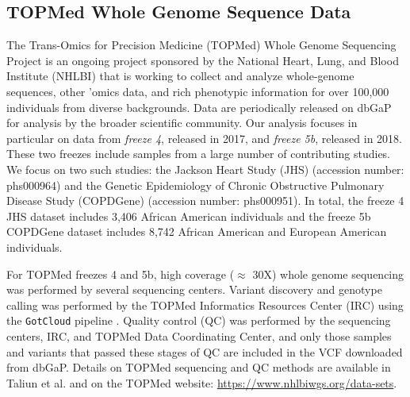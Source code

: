 \documentclass[12pt]{article}
\begin{document}


\subsection{TOPMed Whole Genome Sequence Data}

The Trans-Omics for Precision Medicine (TOPMed) Whole Genome Sequencing Project is an ongoing project sponsored by the National Heart, Lung, and Blood Institute (NHLBI) that is working to collect and analyze whole-genome sequences, other 'omics data, and rich phenotypic information for over 100,000 individuals from diverse backgrounds. 
Data are periodically released on dbGaP for analysis by the broader scientific community. 
Our analysis focuses in particular on data from \textit{freeze 4}, released in 2017, and \textit{freeze 5b}, released in 2018.
These two freezes include samples from a large number of contributing studies.
We focus on two such studies: the Jackson Heart Study (JHS) (accession number: phs000964) and the Genetic Epidemiology of Chronic Obstructive Pulmonary Disease Study (COPDGene) (accession number: phs000951).
In total, the freeze 4 JHS dataset includes 3,406 African American individuals and the freeze 5b COPDGene dataset includes 8,742 African American and European American individuals.

For TOPMed freezes 4 and 5b, high coverage ($\approx$ 30X) whole genome sequencing was performed by several sequencing centers.
Variant discovery and genotype calling was performed by the TOPMed Informatics Resources Center (IRC) using the \texttt{GotCloud} pipeline \citep{jun2015}.
Quality control (QC) was performed by the sequencing centers, IRC, and TOPMed Data Coordinating Center, and only those samples and variants that passed these stages of QC are included in the VCF downloaded from dbGaP.
Details on TOPMed sequencing and QC methods are available in Taliun et al. \citep{taliun2021} and on the TOPMed website: \href{https://www.nhlbiwgs.org/data-sets}{https://www.nhlbiwgs.org/data-sets}.
\end{document}
